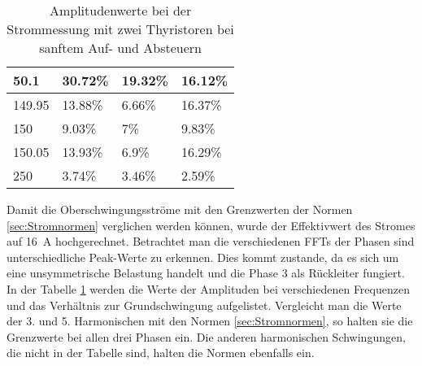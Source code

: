 \begin{table}[ht]
\begin{tabular}{|l|l|l|l|}
		50.1              & 30.72\%                                                                             & 19.32\%                                                                             & 16.12\%                                                                             \\ \hline
		149.95            & 13.88\%                                                                             & 6.66\%                                                                              & 16.37\%                                                                             \\ \hline
		150               & 9.03\%                                                                              & 7\%                                                                                 & 9.83\%                                                                              \\ \hline
		150.05            & 13.93\%                                                                             & 6.9\%                                                                               & 16.29\%                                                                             \\ \hline
		250		          & 3.74\%                                                                             & 3.46\%                                                                               & 2.59\%                                                                             \\ \hline
	\end{tabular}
	\caption{Amplitudenwerte bei der Strommessung mit zwei Thyristoren bei sanftem Auf- und Absteuern}\label{tab:Mess_2Thyristoren_Spannung_Widerstand_AufAb_sanft_stroeme}
\end{table}

Damit die Oberschwingungsströme mit den  Grenzwerten der Normen \ref{sec:Stromnormen} verglichen werden können, wurde der Effektivwert des Stromes auf \SI{16}{A} hochgerechnet. Betrachtet man die verschiedenen FFTs der Phasen sind unterschiedliche Peak-Werte zu erkennen. Dies kommt zustande, da es sich um eine unsymmetrische Belastung handelt und die Phase 3 als Rückleiter fungiert. In der Tabelle \ref{tab:Mess_2Thyristoren_Spannung_Widerstand_AufAb_sanft_stroeme} werden die Werte der Amplituden bei verschiedenen Frequenzen und das Verhältnis zur Grundschwingung aufgelistet. Vergleicht man die Werte der 3. und 5. Harmonischen mit den Normen \ref{sec:Stromnormen}, so halten sie die Grenzwerte bei allen drei Phasen ein. Die anderen harmonischen Schwingungen, die nicht in der Tabelle sind, halten die Normen ebenfalls ein.

